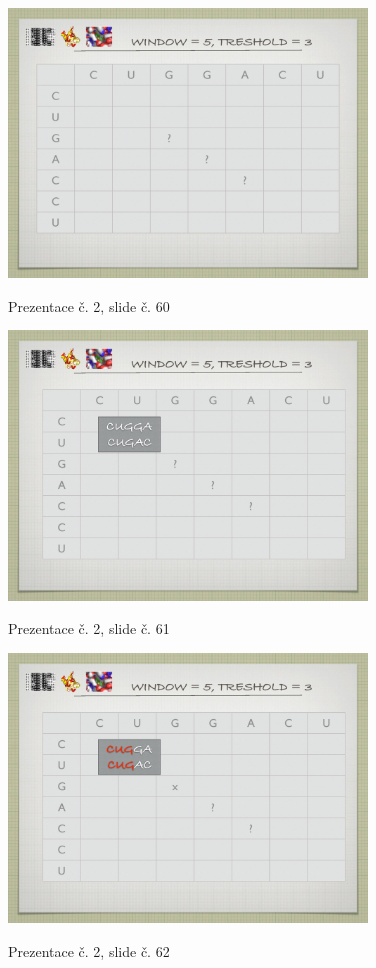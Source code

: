 \documentclass[DIV=8]{scrreprt}
\begin{document}
\begin{figure}
    \caption{Prezentace č. 2, slide č. 60}
    \includegraphics[width=0.85\textwidth]{slides-2/slide-60.jpg}
    \centering
    \label{slides-2-slide-60}
\end{figure}
\begin{figure}
    \caption{Prezentace č. 2, slide č. 61}
    \includegraphics[width=0.85\textwidth]{slides-2/slide-61.jpg}
    \centering
    \label{slides-2-slide-61}
\end{figure}
\begin{figure}
    \caption{Prezentace č. 2, slide č. 62}
    \includegraphics[width=0.85\textwidth]{slides-2/slide-62.jpg}
    \centering
    \label{slides-2-slide-62}
\end{figure}
\end{document}
